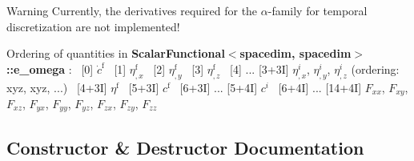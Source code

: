 \begin{DoxyWarning}{Warning}
Currently, the derivatives required for the $\alpha$-\/family for temporal discretization are not implemented!
\end{DoxyWarning}
Ordering of quantities in {\bf Scalar\+Functional$<$spacedim, spacedim$>$\+::e\+\_\+omega} \+:~\newline
\mbox{[}0\mbox{]} $\dot{c}^\mathrm{f}$~\newline
 \mbox{[}1\mbox{]} $\eta^\mathrm{f}_{,x}$~\newline
 \mbox{[}2\mbox{]} $\eta^\mathrm{f}_{,y}$~\newline
 \mbox{[}3\mbox{]} $\eta^\mathrm{f}_{,z}$~\newline
 \mbox{[}4\mbox{]} ... \mbox{[}3+3I\mbox{]} $\eta^i_{,x}$, $\eta^i_{,y}$, $\eta^i_{,z}$ (ordering\+: xyz, xyz, ...)~\newline
 \mbox{[}4+3I\mbox{]} $\eta^\mathrm{f}$~\newline
 \mbox{[}5+3I\mbox{]} $c^\mathrm{f}$~\newline
 \mbox{[}6+3I\mbox{]} ... \mbox{[}5+4I\mbox{]} $c^i$~\newline
 \mbox{[}6+4I\mbox{]} ... \mbox{[}14+4I\mbox{]} $F_{xx}$, $F_{xy}$, $F_{xz}$, $F_{yx}$, $F_{yy}$, $F_{yz}$, $F_{zx}$, $F_{zy}$, $F_{zz}$ 

\subsection{Constructor \& Destructor Documentation}
